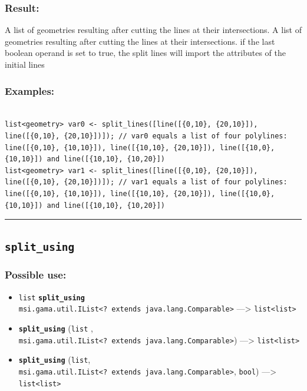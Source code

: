\documentclass[]{book}
\providecommand{\tightlist}{%
  \setlength{\itemsep}{0pt}\setlength{\parskip}{0pt}}
\theoremstyle{definition}
\theoremstyle{definition}
\theoremstyle{definition}
\theoremstyle{remark}
\begin{document}
\subsubsection{Result:}\label{result-479}

A list of geometries resulting after cutting the lines at their
intersections. A list of geometries resulting after cutting the lines at
their intersections. if the last boolean operand is set to true, the
split lines will import the attributes of the initial lines

\subsubsection{Examples:}\label{examples-345}

\begin{verbatim}
 
list<geometry> var0 <- split_lines([line([{0,10}, {20,10}]), line([{0,10}, {20,10}])]); // var0 equals a list of four polylines: line([{0,10}, {10,10}]), line([{10,10}, {20,10}]), line([{10,0}, {10,10}]) and line([{10,10}, {10,20}]) 
list<geometry> var1 <- split_lines([line([{0,10}, {20,10}]), line([{0,10}, {20,10}])]); // var1 equals a list of four polylines: line([{0,10}, {10,10}]), line([{10,10}, {20,10}]), line([{10,0}, {10,10}]) and line([{10,10}, {10,20}])
\end{verbatim}

\begin{center}\rule{0.5\linewidth}{\linethickness}\end{center}

\subsection{\texorpdfstring{\texttt{split\_using}}{split\_using}}\label{split_using}

\subsubsection{Possible use:}\label{possible-use-496}

\begin{itemize}
\tightlist
\item
  \texttt{list} \textbf{\texttt{split\_using}}
  \texttt{msi.gama.util.IList\textless{}?\ extends\ java.lang.Comparable\textgreater{}}
  ---\textgreater{} \texttt{list\textless{}list\textgreater{}}
\item
  \textbf{\texttt{split\_using}} (\texttt{list} ,
  \texttt{msi.gama.util.IList\textless{}?\ extends\ java.lang.Comparable\textgreater{}})
  ---\textgreater{} \texttt{list\textless{}list\textgreater{}}
\item
  \textbf{\texttt{split\_using}} (\texttt{list},
  \texttt{msi.gama.util.IList\textless{}?\ extends\ java.lang.Comparable\textgreater{}},
  \texttt{bool}) ---\textgreater{}
  \texttt{list\textless{}list\textgreater{}}
\end{itemize}
\end{document}
